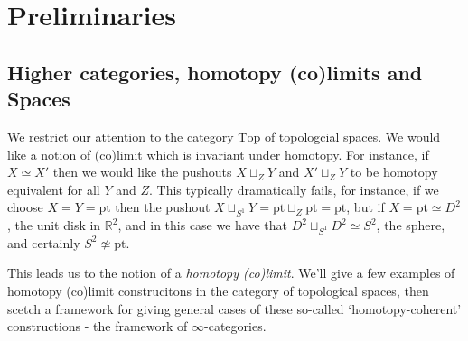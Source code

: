 \newpage
\section{Preliminaries}
\subsection{Higher categories, homotopy (co)limits and Spaces}

We restrict our attention to the category $\text{Top}$ of topologcial spaces. We would like a notion of (co)limit which is invariant under homotopy. For instance, if $X \simeq X'$ then we would like the pushouts $X \sqcup_Z Y$ and $X' \sqcup_Z Y$ to be homotopy equivalent for all $Y$ and $Z$. This typically dramatically fails, for instance, if we choose $X = Y = \text{pt}$ then the pushout $X \sqcup_{S^1} Y = \text{pt} \sqcup_Z \text{pt} = \text{pt}$, but if $X = \text{pt} \simeq D^2$, the unit disk in $\mathbb{R}^2$, and in this case we have that $D^2 \sqcup_{S^1} D^2 \simeq S^2$, the sphere, and certainly $S^2 \not\simeq \text{pt}$.


This leads us to the notion of a \textit{homotopy (co)limit}. We'll give a few examples of homotopy (co)limit construcitons in the category of topological spaces, then scetch a framework for giving general cases of these so-called `homotopy-coherent' constructions - the framework of $\infty$-categories.

